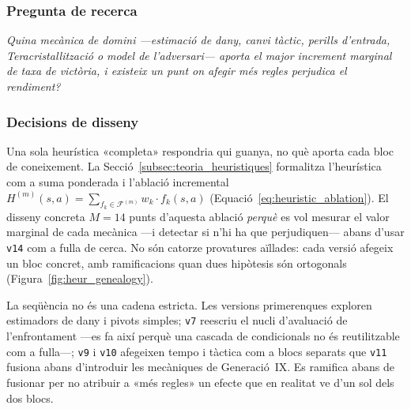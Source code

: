 \subsubsection*{Pregunta de recerca}

\emph{Quina mecànica de domini ---estimació de dany, canvi tàctic, perills d'entrada, Teracristal\-lització o model de l'adversari--- aporta el major increment marginal de taxa de victòria, i existeix un punt on afegir més regles perjudica el rendiment?}

\subsubsection*{Decisions de disseny}

Una sola heurística «completa» respondria qui guanya, no què aporta cada bloc de coneixement. La Secció~\ref{subsec:teoria_heuristiques} formalitza l'heurística com a suma ponderada i l'ablació incremental $H^{(m)}(s,a) = \sum_{f_k \in \mathcal{F}^{(m)}} w_k \cdot f_k(s,a)$ (Equació~\ref{eq:heuristic_ablation}). El disseny concreta $M = 14$ punts d'aquesta ablació \emph{perquè} es vol mesurar el valor marginal de cada mecànica ---i detectar si n'hi ha que perjudiquen--- abans d'usar \texttt{v14} com a fulla de cerca. No són catorze provatures aïllades: cada versió afegeix un bloc concret, amb ramificacions quan dues hipòtesis són ortogonals (Figura~\ref{fig:heur_genealogy}).

La seqüència no és una cadena estricta. Les versions primerenques exploren estimadors de dany i pivots simples; \texttt{v7} reescriu el nucli d'avaluació de l'enfrontament ---es fa així perquè una cascada de condicionals no és reutilitzable com a fulla---; \texttt{v9} i \texttt{v10} afegeixen tempo i tàctica com a blocs separats que \texttt{v11} fusiona abans d'introduir les mecàniques de Generació~IX. Es ramifica abans de fusionar per no atribuir a «més regles» un efecte que en realitat ve d'un sol dels dos blocs.

